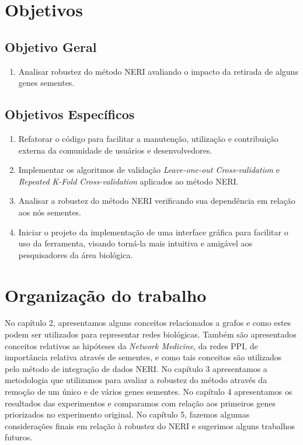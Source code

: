 \section{Objetivos}
\subsection{Objetivo Geral}
\begin{center}
  \begin{enumerate}
  \item {Analisar robustez do método NERI avaliando o impacto da retirada de alguns genes sementes.}

  \end{enumerate}
\end{center}

\subsection{Objetivos Específicos}
\begin{center}
  \begin{enumerate}
  \item {Refatorar o código para facilitar a manutenção, utilização e contribuição externa da comunidade de usuários e desenvolvedores.}
    \item {Implementar os algoritmos de validação \textsl{Leave-one-out Cross-validation} e \textsl{Repeated K-Fold Cross-validation} aplicados ao método NERI.}
    \item {Analisar a robustez do método NERI verificando sua dependência em relação aos nós sementes.}
    \item{Iniciar o projeto da implementação de uma interface gráfica para facilitar o uso da ferramenta, visando torná-la mais intuitiva e amigável aos pesquisadores da área biológica.}
  \end{enumerate}
\end{center}


\section{Organização do trabalho}

No capítulo 2, apresentamos alguns conceitos relacionados a grafos e como estes podem ser utilizados para representar redes biológicas. Também são apresentados conceitos relativos as hipóteses da \textsl{Network Medicine}, da redes PPI, de importância relativa através de sementes, e como tais conceitos são utilizados pelo método de integração de dados NERI.
No capítulo 3 apresentamos a metodologia que utilizamos para avaliar a robustez do método através da remoção de um único e de vários genes sementes.
No capítulo 4 apresentamos os resultados das experimentos e comparamos com relação aos primeiros genes priorizados no experimento original.
No capítulo 5, fazemos algumas considerações finais em relação à robustez do NERI e sugerimos alguns trabalhos futuros.
